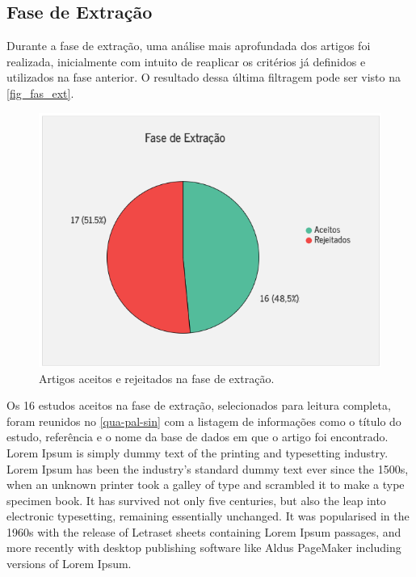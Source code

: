 \newpage{}

\subsection{Fase de Extração}

Durante a fase de extração, uma análise mais aprofundada dos artigos foi realizada, inicialmente com intuito de reaplicar os critérios já definidos e utilizados na fase anterior. O resultado dessa última filtragem pode ser visto na \autoref{fig_fas_ext}.

\begin{figure}[htb]
	\caption{\label{fig_fas_ext}Artigos aceitos e rejeitados na fase de extração.}
	\begin{center}
	    \includegraphics[scale=0.85]{Imagens/msl/fase_extracao_artigos.png}
	\end{center}
\end{figure}

Os 16 estudos aceitos na fase de extração, selecionados para leitura completa, foram reunidos no \autoref{qua-pal-sin} com a listagem de informações como o título do estudo, referência e o nome da base de dados em que o artigo foi encontrado. Lorem Ipsum is simply dummy text of the printing and typesetting industry. Lorem Ipsum has been the industry's standard dummy text ever since the 1500s, when an unknown printer took a galley of type and scrambled it to make a type specimen book. It has survived not only five centuries, but also the leap into electronic typesetting, remaining essentially unchanged. It was popularised in the 1960s with the release of Letraset sheets containing Lorem Ipsum passages, and more recently with desktop publishing software like Aldus PageMaker including versions of Lorem Ipsum.

